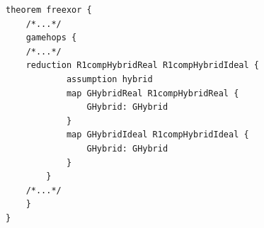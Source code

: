 \begin{longlisting}
\begin{verbatim}
theorem freexor {
    /*...*/
    gamehops {
    /*...*/
    reduction R1compHybridReal R1compHybridIdeal {
            assumption hybrid
            map GHybridReal R1compHybridReal {
                GHybrid: GHybrid
            }
            map GHybridIdeal R1compHybridIdeal {
                GHybrid: GHybrid
            }
        } 
    /*...*/
    }
}
\end{verbatim}
\caption{Game hop 2 in the  theorem}
\label{lst:domino-freexor-gamehop1}
\end{longlisting}